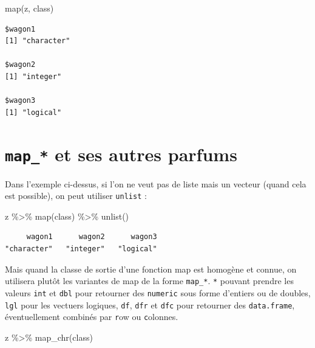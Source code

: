 \documentclass[
  letterpaper,
  DIV=11,
  numbers=noendperiod]{scrreprt}
\newenvironment{Shaded}{\begin{snugshade}}{\end{snugshade}}
\newcommand{\FunctionTok}[1]{\textcolor[rgb]{0.28,0.35,0.67}{#1}}
\newcommand{\NormalTok}[1]{\textcolor[rgb]{0.00,0.23,0.31}{#1}}
\newcommand{\SpecialCharTok}[1]{\textcolor[rgb]{0.37,0.37,0.37}{#1}}
\begin{document}
\begin{Shaded}
\begin{Highlighting}[]
\FunctionTok{map}\NormalTok{(z, class)}
\end{Highlighting}
\end{Shaded}

\begin{verbatim}
$wagon1
[1] "character"

$wagon2
[1] "integer"

$wagon3
[1] "logical"
\end{verbatim}

\hypertarget{map_-et-ses-autres-parfums}{%
\section{\texorpdfstring{\texttt{map\_*} et ses autres
parfums}{map\_* et ses autres parfums}}\label{map_-et-ses-autres-parfums}}

Dans l'exemple ci-dessus, si l'on ne veut pas de liste mais un vecteur
(quand cela est possible), on peut utiliser \texttt{unlist} :

\begin{Shaded}
\begin{Highlighting}[]
\NormalTok{z }\SpecialCharTok{\%\textgreater{}\%} \FunctionTok{map}\NormalTok{(class) }\SpecialCharTok{\%\textgreater{}\%} \FunctionTok{unlist}\NormalTok{()}
\end{Highlighting}
\end{Shaded}

\begin{verbatim}
     wagon1      wagon2      wagon3 
"character"   "integer"   "logical" 
\end{verbatim}

Mais quand la classe de sortie d'une fonction map est homogène et
connue, on utilisera plutôt les variantes de map de la forme
\texttt{map\_*}. \texttt{*} pouvant prendre les valeurs \texttt{int} et
\texttt{dbl} pour retourner des \texttt{numeric} sous forme d'entiers ou
de doubles, \texttt{lgl} pour les vectuers logiques, \texttt{df},
\texttt{dfr} et \texttt{dfc} pour retourner des \texttt{data.frame},
éventuellement combinés par \texttt{r}ow ou \texttt{c}olonnes.

\begin{Shaded}
\begin{Highlighting}[]
\NormalTok{z }\SpecialCharTok{\%\textgreater{}\%} \FunctionTok{map\_chr}\NormalTok{(class)}
\end{Highlighting}
\end{Shaded}
\end{document}
